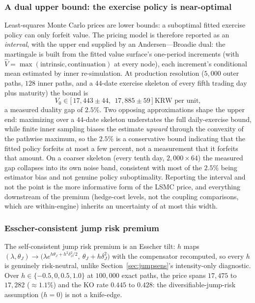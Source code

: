 \documentclass[11pt,a4paper]{article}
\begin{document}
\subsubsection{A dual upper bound: the exercise policy is near-optimal}
\label{sec:dual}

Least-squares Monte Carlo prices are lower bounds: a suboptimal fitted exercise policy can only forfeit value. The pricing model is therefore reported as an \emph{interval}, with the upper end supplied by an Andersen---Broadie dual: the martingale is built from the fitted value surface's one-period increments (with $\hat V=\max(\text{intrinsic},\text{continuation})$ at every node), each increment's conditional mean estimated by inner re-simulation. At production resolution ($5{,}000$ outer paths, $128$ inner paths, and a $44$-date exercise skeleton of every fifth trading day plus maturity) the bound is
\begin{equation}
V_0 \in \big[\,17{,}443\pm44,\ \ 17{,}885\pm59\,\big]\ \text{KRW per unit},
\end{equation}
a measured duality gap of $2.5\%$. Two opposing approximations shape the upper end: maximizing over a $44$-date skeleton understates the full daily-exercise bound, while finite inner sampling biases the estimate \emph{upward} through the convexity of the pathwise maximum, so the $2.5\%$ is a conservative bound indicating that the fitted policy forfeits at most a few percent, not a measurement that it forfeits that amount. On a coarser skeleton (every tenth day, $2{,}000\times64$) the measured gap collapses into its own noise band, consistent with most of the $2.5\%$ being estimator bias and not genuine policy suboptimality. Reporting the interval and not the point is the more informative form of the LSMC price, and everything downstream of the premium (hedge-cost levels, not the coupling comparisons, which are within-engine) inherits an uncertainty of at most this width.

\subsubsection{Esscher-consistent jump risk premium}
\label{sec:esscher}

The self-consistent jump risk premium is an Esscher tilt: $h$ maps $(\lambda,\theta_J)\to\big(\lambda e^{h\theta_J+h^2\delta_J^2/2},\ \theta_J+h\delta_J^2\big)$ with the compensator recomputed, so every $h$ is genuinely risk-neutral, unlike Section~\ref{sec:jumpsens}'s intensity-only diagnostic. Over $h\in\{-0.5,0,0.5,1.0\}$ at $100{,}000$ exact paths, the price spans $17{,}475$ to $17{,}282$ ($\approx1.1\%$) and the KO rate $0.445$ to $0.428$: the diversifiable-jump-risk assumption ($h=0$) is not a knife-edge.
\end{document}
